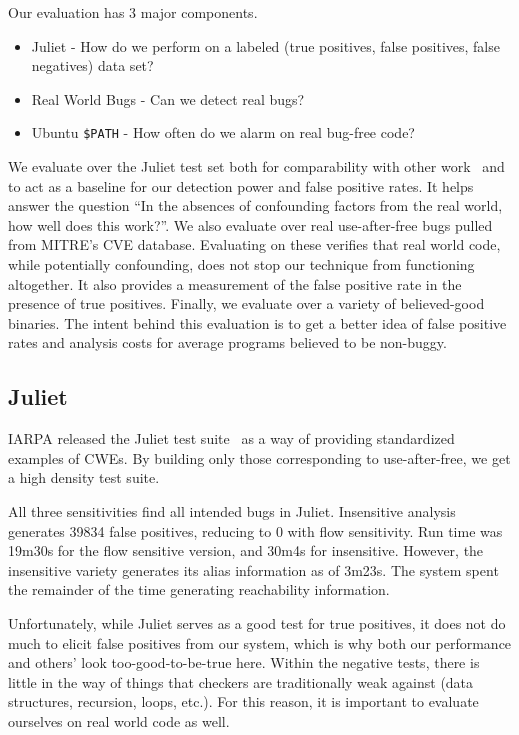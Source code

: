 \label{alias:sec:eval}
Our evaluation has 3 major components.
\begin{itemize}
\item Juliet - How do we perform on a labeled (true positives, false positives, false negatives) data set?
\item Real World Bugs - Can we detect real bugs? 
\item Ubuntu \texttt{\$PATH} - How often do we alarm on real bug-free code?
\end{itemize}

We evaluate over the Juliet test set both for comparability with other work~\cite{tac, juliet-eval-static-source} and to act as a baseline for our detection power and false positive rates.
It helps answer the question ``In the absences of confounding factors from the real world, how well does this work?''.
We also evaluate over real use-after-free bugs pulled from MITRE's CVE database.
Evaluating on these verifies that real world code, while potentially confounding, does not stop our technique from functioning altogether.
It also provides a measurement of the false positive rate in the presence of true positives.
Finally, we evaluate over a variety of believed-good binaries.
The intent behind this evaluation is to get a better idea of false positive rates and analysis costs for average programs believed to be non-buggy.

\subsection{Juliet}
IARPA released the Juliet test suite~\cite{juliet} as a way of providing standardized examples of CWEs.
By building only those corresponding to use-after-free, we get a high density test suite.

All three sensitivities find all intended bugs in Juliet.
Insensitive analysis generates 39834 false positives, reducing to 0 with flow sensitivity.
Run time was 19m30s for the flow sensitive version, and 30m4s for insensitive.
However, the insensitive variety generates its alias information as of 3m23s.
The system spent the remainder of the time generating reachability information.

Unfortunately, while Juliet serves as a good test for true positives, it does not do much to elicit false positives from our system, which is why both our performance and others' look too-good-to-be-true here.
Within the negative tests, there is little in the way of things that checkers are traditionally weak against (data structures, recursion, loops, etc.).
For this reason, it is important to evaluate ourselves on real world code as well.

